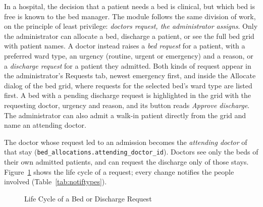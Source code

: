 In a hospital, the decision that a patient needs a bed is clinical, but which bed is free is known to the bed manager. The module follows the same division of work, on the principle of least privilege: \emph{doctors request, the administrator assigns}. Only the administrator can allocate a bed, discharge a patient, or see the full bed grid with patient names. A doctor instead raises a \emph{bed request} for a patient, with a preferred ward type, an urgency (routine, urgent or emergency) and a reason, or a \emph{discharge request} for a patient they admitted. Both kinds of request appear in the administrator's Requests tab, newest emergency first, and inside the Allocate dialog of the bed grid, where requests for the selected bed's ward type are listed first. A bed with a pending discharge request is highlighted in the grid with the requesting doctor, urgency and reason, and its button reads \emph{Approve discharge}. The administrator can also admit a walk-in patient directly from the grid and name an attending doctor.

The doctor whose request led to an admission becomes the \emph{attending doctor} of that stay (\texttt{bed\_allocations.attending\_doctor\_id}). Doctors see only the beds of their own admitted patients, and can request the discharge only of those stays. Figure~\ref{fig:bedreq} shows the life cycle of a request; every change notifies the people involved (Table~\ref{tab:notiftypes}).

\begin{figure}[H]
\centering
{}
\caption{Life Cycle of a Bed or Discharge Request}
\label{fig:bedreq}
\end{figure}

